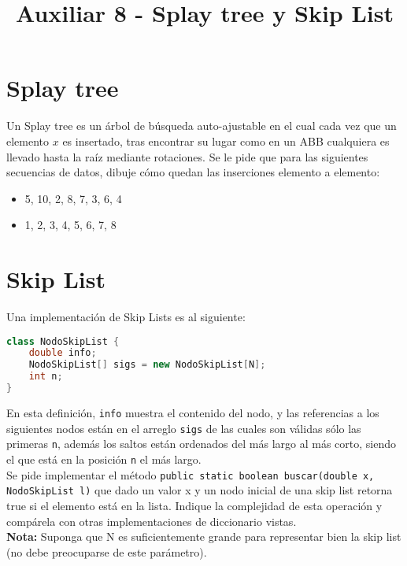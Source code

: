 \documentclass[dcc,sol]{fcfmcourse}
\title{Auxiliar 8 - Splay tree y Skip List}
\begin{document}
\maketitle

\vspace{-1ex}


\section*{Splay tree}
\begin{problems}
\problem Un Splay tree es un árbol de búsqueda auto-ajustable en el cual cada vez que un elemento $x$ es insertado, tras encontrar su lugar como en un ABB cualquiera es llevado hasta la raíz mediante rotaciones. Se le pide que para las siguientes secuencias de datos, dibuje cómo quedan las inserciones elemento a elemento:
\begin{itemize}
    \item 5, 10, 2, 8, 7, 3, 6, 4
    \item 1, 2, 3, 4, 5, 6, 7, 8
\end{itemize}
\end{problems}

\section*{Skip List}
\begin{problems}
\problem Una implementación de Skip Lists es al siguiente:

\begin{lstlisting}[language=Java]
class NodoSkipList {
    double info;
    NodoSkipList[] sigs = new NodoSkipList[N];
    int n;
}
\end{lstlisting}

En esta definición, \texttt{info} muestra el contenido del nodo, y las referencias a los siguientes nodos están en el arreglo \texttt{sigs} de las cuales son válidas sólo las primeras \texttt{n}, además los saltos están ordenados del más largo al más corto, siendo el que está en la posición \texttt{n} el más largo.\\

Se pide implementar el método \texttt{public static boolean buscar(double x, NodoSkipList l)} que dado un valor x y un nodo inicial de una skip list retorna true si el elemento está en la lista. Indique la complejidad de esta operación y compárela con otras implementaciones de diccionario vistas. \\

\textbf{Nota:} Suponga que N es suficientemente grande para representar bien la skip list (no debe preocuparse de este parámetro).

\end{problems}
\end{document}
